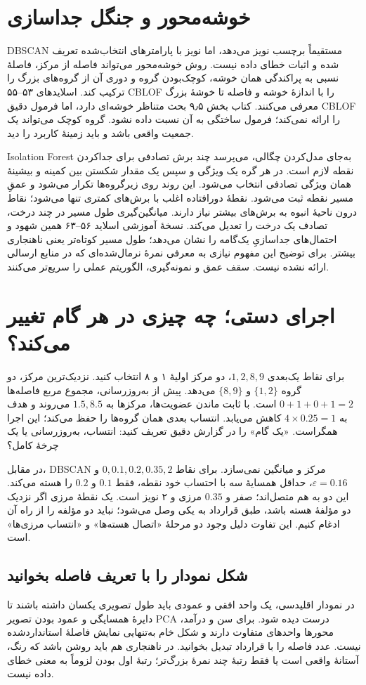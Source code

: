 \section{خوشه‌محور و جنگل جداسازی}

DBSCAN مستقیماً برچسب نویز می‌دهد، اما نویز با پارامترهای انتخاب‌شده تعریف شده و اثبات خطای داده نیست. روش خوشه‌محور می‌تواند فاصله از مرکز، فاصلهٔ نسبی به پراکندگی همان خوشه، کوچک‌بودن گروه و دوری آن از گروه‌های بزرگ را ترکیب کند. اسلایدهای ۵۳--۵۵ CBLOF را با اندازهٔ خوشه و فاصله تا خوشهٔ بزرگ معرفی می‌کنند. کتاب بخش ۹٫۵ بحث متناظر خوشه‌ای دارد، اما فرمول دقیق CBLOF را ارائه نمی‌کند؛ فرمول ساختگی به آن نسبت داده نشود. گروه کوچک می‌تواند یک جمعیت واقعی باشد و باید زمینهٔ کاربرد را دید.

Isolation Forest به‌جای مدل‌کردن چگالی، می‌پرسد چند برش تصادفی برای جداکردن نقطه لازم است. در هر گره یک ویژگی و سپس یک مقدار شکستن بین کمینه و بیشینهٔ همان ویژگی تصادفی انتخاب می‌شود. این روند روی زیرگروه‌ها تکرار می‌شود و عمقِ مسیر نقطه ثبت می‌شود. نقطهٔ دورافتاده اغلب با برش‌های کمتری تنها می‌شود؛ نقاط درون ناحیهٔ انبوه به برش‌های بیشتر نیاز دارند. میانگین‌گیری طول مسیر در چند درخت، تصادف یک درخت را تعدیل می‌کند. نسخهٔ آموزشی اسلاید ۵۶--۶۳ همین شهود و احتمال‌های جداسازیِ یک‌گامه را نشان می‌دهد؛ طول مسیر کوتاه‌تر یعنی ناهنجاری بیشتر. برای توضیح این مفهوم نیازی به معرفی نمرهٔ نرمال‌شده‌ای که در منابع ارسالی ارائه نشده نیست. سقف عمق و نمونه‌گیری، الگوریتم عملی را سریع‌تر می‌کنند.
\section{اجرای دستی؛ چه چیزی در هر گام تغییر می‌کند؟}
برای نقاط یک‌بعدی $1,2,8,9$، دو مرکز اولیهٔ ۱ و ۸ انتخاب کنید. نزدیک‌ترین مرکز، دو گروه $\{1,2\}$ و $\{8,9\}$ می‌دهد. پیش از به‌روزرسانی، مجموع مربع فاصله‌ها $0+1+0+1=2$ است. با ثابت ماندن عضویت‌ها، مرکزها به $1.5,8.5$ می‌روند و هدف به $4\times0.25=1$ کاهش می‌یابد. انتساب بعدی همان گروه‌ها را حفظ می‌کند؛ این اجرا همگراست. «یک گام» را در گزارش دقیق تعریف کنید: انتساب، به‌روزرسانی یا یک چرخهٔ کامل؟

در مقابل، DBSCAN مرکز و میانگین نمی‌سازد. برای نقاط $0,0.1,0.2,0.35,2$ و $\varepsilon=0.16$، حداقل همسایهٔ سه با احتساب خود نقطه، فقط $0.1$ و $0.2$ را هسته می‌کند. این دو به هم متصل‌اند؛ صفر و $0.35$ مرزی و ۲ نویز است. یک نقطهٔ مرزی اگر نزدیک دو مؤلفهٔ هسته باشد، طبق قرارداد به یکی وصل می‌شود؛ نباید دو مؤلفه را از راه آن ادغام کنیم. این تفاوت دلیل وجود دو مرحلهٔ «اتصال هسته‌ها» و «انتساب مرزی‌ها» است.

\subsection*{شکل نمودار را با تعریف فاصله بخوانید}
در نمودار اقلیدسی، یک واحد افقی و عمودی باید طول تصویری یکسان داشته باشند تا دایرهٔ همسایگی و عمود بودن تصویر PCA درست دیده شود. برای سن و درآمد، محورها واحدهای متفاوت دارند و شکل خام به‌تنهایی نمایش فاصلهٔ استانداردشده نیست. عدد فاصله را با قرارداد تبدیل بخوانید. در ناهنجاری هم باید روشن باشد که رنگ، آستانهٔ واقعی است یا فقط رتبهٔ چند نمرهٔ بزرگ‌تر؛ رتبهٔ اول بودن لزوماً به معنی خطای داده نیست.


